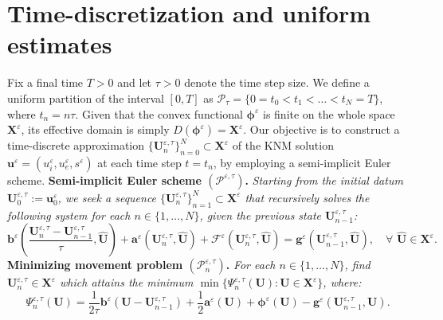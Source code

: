 \documentclass[a4paper,11pt]{article}
\theoremstyle{definition}
\numberwithin{equation}{section}
\newcommand{\e}{\varepsilon}
\begin{document}



\section{Time-discretization and uniform estimates}

Fix a final time $T > 0$ and let $\tau > 0$ denote the time step size. We define a uniform partition of the interval $[0, T]$ as $\mathcal{P}_\tau = \{ 0 = t_0 < t_1 < \dots < t_N = T \}$, where $t_n = n\tau$. Given that the convex functional $\mathbf{\phi}^\e$ is finite on the whole space $\mathbf{X}^\e$, its effective domain is simply $D(\mathbf{\phi}^\e) = \mathbf{X}^\e$. Our objective is to construct a time-discrete approximation $\{ \mathbf{U}_n^{\e,\tau} \}_{n=0}^N \subset \mathbf{X}^\e$ of the KNM solution $\mathbf{u}^\e = (u_i^{\e}, u_e^{\e}, s^\e)$ at each time step $t = t_n$, by employing a semi-implicit Euler scheme.
\vskip0.2cm
\noindent
\textbf{Semi-implicit Euler scheme $(\mathcal{P}^{\e,\tau})$.} 
\textit{Starting from the initial datum $\mathbf{U}_0^{\e,\tau} := \mathbf{u}_0^\e$, we seek a sequence $\{\mathbf{U}_n^{\e,\tau}\}_{n=1}^N \subset \mathbf{X}^\e$ that recursively solves the following system for each $n \in \{ 1, \dots, N \}$, given the previous state $\mathbf{U}_{n-1}^{\e,\tau}$:}
\begin{equation}
	\label{P-eps-tau}
	\mathbf{b}^\e \left( \frac{\mathbf{U}_n^{\e,\tau} - \mathbf{U}_{n-1}^{\e,\tau}}{\tau}, \widehat{\mathbf{U}} \right) + \mathbf{a}^\e(\mathbf{U}_n^{\e,\tau}, \widehat{\mathbf{U}}) + \mathcal{F}^\e(\mathbf{U}_n^{\e,\tau}, \widehat{\mathbf{U}}) = \mathbf{g}^\e(\mathbf{U}_{n-1}^{\e,\tau}, \widehat{\mathbf{U}}), \quad \forall\,\, \widehat{\mathbf{U}} \in \mathbf{X}^\e.
\end{equation}
\vskip0.2cm
\noindent
\textbf{Minimizing movement problem $(\mathcal{P}^{\e,\tau}_n)$.} \textit{For each $n \in \{ 1, \dots, N \}$, find $\mathbf{U}_n^{\e,\tau} \in \mathbf{X}^\e$ which attains the minimum $\min \{ \Psi_{n}^{\e,\tau}(\mathbf{U}) : \mathbf{U} \in \mathbf{X}^\e \}$, where:}
\begin{equation}
	\label{MM-eps}
	\Psi_{n}^{\e,\tau}(\mathbf{U}) = \frac{1}{2\tau} \mathbf{b}^\e\left(\mathbf{U} - \mathbf{U}_{n-1}^{\e,\tau}\right) + \frac{1}{2} \mathbf{a}^\e(\mathbf{U}) + \mathbf{\phi}^\e(\mathbf{U}) - \mathbf{g}^\e\left(\mathbf{U}_{n-1}^{\e,\tau}, \mathbf{U}\right).
\end{equation}
\end{document}
